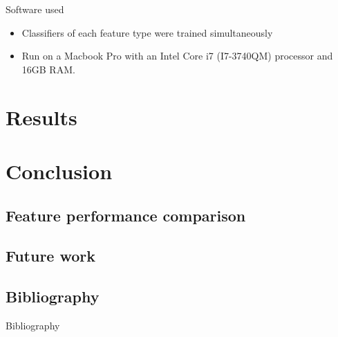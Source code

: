 \documentclass{beamer}
\begin{document}
\begin{frame}{Software used}
	\begin{itemize}
		\item Classifiers of each feature type were trained simultaneously
		\item Run on a Macbook Pro with an Intel Core i7 (I7-3740QM) processor and 16GB RAM.
	\end{itemize}
\end{frame}


\section{Results}


\section{Conclusion}

	\subsection{Feature performance comparison}

	\subsection{Future work}

	\subsection{Bibliography}

	\begin{frame}{Bibliography}
		
		
	\end{frame}
\end{document}
